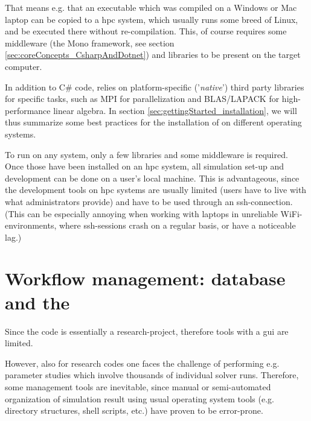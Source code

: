 \documentclass[a4paper,10pt]{report} %
\begin{document}
That means e.g. that an executable which was compiled on a Windows or Mac laptop can be copied 
to a \ac{hpc} system, which usually runs some breed of Linux, and be executed there without re-compilation.
This, of course requires some middleware (the Mono framework, see section \ref{sec:coreConcepts_CsharpAndDotnet})
and libraries to be present on the target computer.

In addition to C\# code,  \BoSSS{} relies on platform-specific ('\emph{native}') third party libraries for specific tasks, 
such as MPI for parallelization and BLAS/LAPACK for high-performance linear algebra. In 
section \ref{sec:gettingStarted_installation}, we will thus 
summarize some best practices for the installation of \BoSSS{} on different operating systems.

To run \BoSSS{} on any system, only a few libraries and some middleware is required. Once those have been installed on an 
\ac{hpc} system, all simulation set-up and development can be done 
on a user's local machine.
This is advantageous, since the development tools on \ac{hpc} systems are usually limited
(users have to live with what administrators provide)
and have to be used through an ssh-connection.
(This can be especially annoying when working with laptops in unreliable WiFi-environments,
where ssh-sessions crash on a regular basis, or have a noticeable lag.)

\section{Workflow management: database and the \BoSSSpad}
\label{sec:coreConcepts_BoSSSpad}
Since the \BoSSS{} code is essentially a research-project, therefore 
tools with a \ac{gui}  are limited.

However, also for research codes  one faces the challenge of performing 
e.g. parameter studies which involve thousands of individual 
solver runs.
Therefore, some management tools are inevitable, since manual or semi-automated
organization of simulation result using usual operating system tools (e.g. 
directory structures, shell scripts, etc.) have proven to be error-prone.
\end{document}
